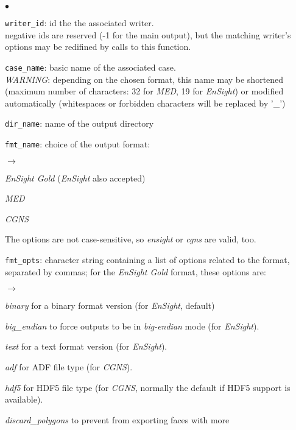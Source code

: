 {{{\begin{list}{$\bullet$}{}
       \item \texttt{writer\_id}: id the the associated writer.\\
             negative ids are reserved (-1 for the main output),
             but the matching writer's options may be redifined by
             calls to this function.
       \item \texttt{case\_name}: basic name of the associated case.\\ {\em
             WARNING}: depending on the chosen format, this name may
             be shortened (maximum number of characters: 32 for {\em MED},
             19 for {\em EnSight}) or modified automatically (whitespaces or
             forbidden characters will be replaced by '\_')
       \item \texttt{dir\_name}: name of the output directory
       \item \texttt{fmt\_name}: choice of the output format:
        \begin{list}{$\rightarrow$}{}
               \item {\em EnSight Gold} ({\em EnSight} also accepted)
               \item {\em MED}
               \item {\em CGNS}
         \end{list}
The options are not case-sensitive, so {\em ensight} or {\em cgns} are valid, too.
       \item \texttt{fmt\_opts}: character string containing a list of
             options related to the format, separated by commas; for the
             {\em EnSight Gold} format, these options are:
        \begin{list}{$\rightarrow$}{}
               \item {\em binary} for a binary format version (for {\em EnSight}, default)
               \item {\em big\_endian} to force outputs to be in {\em big-endian}
                 mode (for {\em EnSight}).
               \item {\em text} for a text format version (for {\em EnSight}).
               \item {\em adf} for ADF file type (for {\em CGNS}).
               \item {\em hdf5} for HDF5 file type (for {\em CGNS}, normally the
                 default if HDF5 support is available).
               \item {\em discard\_polygons} to prevent from exporting faces with more

\end{list}
\end{list}}}}
